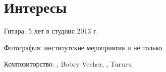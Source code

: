 \section{\textbf{Интересы}}
\resumeSubHeadingListStart

\resumePOR
{Гитара: }{5 лет в студии}{с 2013 г.}

\resumePOR
{Фотография: }{институтские мероприятия и не только}{
  \href{https://drive.google.com/drive/folders/1S_1VVjogLx_cx-q7ShR8GvaXnrCiqNO_?usp=sharing}{}}

\resumePOR
{Композиторство: }{
  \href{https://open.spotify.com/track/5PontWU2UMywIl6hBwr9Wj?si=a2f4113a990049e2}{},
  Bobry Vecher,
  \href{https://open.spotify.com/track/39fr1YcMNzdfHPDHr594tm?si=a5c31ddf0f3743f6}{},
  Tururu}
{\href{https://github.com/NTheme/Music}{}}

\resumeSubHeadingListEnd
